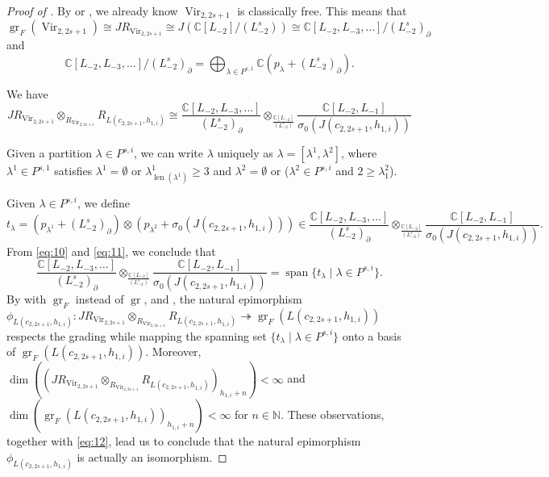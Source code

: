 \documentclass[a4paper, 12pt, reqno]{amsart}
\theoremstyle{remark}
\DeclareMathOperator{\Vir}{Vir}
\DeclareMathOperator{\len}{len}
\DeclareMathOperator{\gr}{gr}
\DeclareMathOperator{\vspan}{span}
\begin{document}
\begin{proof}[Proof of ]
  By \cite{van_ekeren_chiral_2021} or \cite{bruschek_arc_2013}, we already know $\Vir_{2, 2s + 1}$ is classically free.
  This means that $\gr_F(\Vir_{2, 2s + 1}) \cong JR_{\Vir_{2, 2s + 1}} \cong J(\mathbb{C}[L_{-2}]/(L_{-2}^s)) \cong \mathbb{C}[L_{-2}, L_{-3}, \dots]/(L_{-2}^s)_{\partial}$ and
  \begin{equation}
    \label{eq:11}
    \mathbb{C}[L_{-2}, L_{-3}, \dots]/(L_{-2}^s)_{\partial} = \bigoplus_{\lambda \in P^{s, 1}}\mathbb{C}(p_{\lambda} + (L_{-2}^s)_{\partial}).
  \end{equation}

  We have
  \begin{equation*}
    JR_{\Vir_{2, 2s + 1}} \otimes_{R_{\Vir_{2, 2s + 1}}} R_{L(c_{2, 2s + 1}, h_{1, i})} \cong \frac{\mathbb{C}[L_{-2}, L_{-3}, \dots]}{(L_{-2}^s)_{\partial}} \otimes_{\frac{\mathbb{C}[L_{-2}]}{(L_{-2}^s)}}\frac{\mathbb{C}[L_{-2}, L_{-1}]}{\sigma_0(J(c_{2, 2s + 1}, h_{1, i}))}
  \end{equation*}

  Given a partition $\lambda \in P^{s, i}$, we can write $\lambda$ uniquely as $\lambda = [\lambda^1, \lambda^2]$, where $\lambda^1 \in P^{s, 1}$ satisfies $\lambda^1 = \emptyset$ or $\lambda^1_{\len(\lambda^1)} \ge 3$ and $\lambda^2 = \emptyset$ or ($\lambda^2 \in P^{s, i}$ and $2 \ge \lambda^2_1$).

  Given $\lambda \in P^{s, i}$, we define
  \begin{equation*}
    t_{\lambda} = (p_{\lambda^1} + (L_{-2}^s)_{\partial})\otimes(p_{\lambda^2} + \sigma_0(J(c_{2, 2s + 1}, h_{1, i}))) \in \frac{\mathbb{C}[L_{-2}, L_{-3}, \dots]}{(L_{-2}^s)_{\partial}} \otimes_{\frac{\mathbb{C}[L_{-2}]}{(L_{-2}^s)}} \frac{\mathbb{C}[L_{-2}, L_{-1}]}{\sigma_0(J(c_{2, 2s + 1}, h_{1, i}))}.
  \end{equation*}
  From \eqref{eq:10} and \eqref{eq:11}, we conclude that
  \begin{equation}
    \label{eq:12}
    \frac{\mathbb{C}[L_{-2}, L_{-3}, \dots]}{(L_{-2}^s)_{\partial}} \otimes_{\frac{\mathbb{C}[L_{-2}]}{(L_{-2}^s)}} \frac{\mathbb{C}[L_{-2}, L_{-1}]}{\sigma_0(J(c_{2, 2s + 1}, h_{1, i}))} = \vspan\{t_{\lambda} \mid \lambda \in P^{s, i}\}.
  \end{equation}
  By  with $\gr_F$ instead of $\gr$,  and , the natural epimorphism $\phi_{L(c_{2, 2s + 1}, h_{1, i})}: JR_{\Vir_{2, 2s + 1}} \otimes_{R_{\Vir_{2, 2s + 1}}} R_{L(c_{2, 2s + 1}, h_{1, i})} \twoheadrightarrow \gr_F(L(c_{2, 2s + 1}, h_{1, i}))$ respects the grading while mapping the spanning set $\{t_{\lambda} \mid \lambda \in P^{s, i}\}$ onto a basis of $\gr_F(L(c_{2, 2s + 1}, h_{1, i}))$.
  Moreover, $\dim((JR_{\Vir_{2, 2s + 1}} \otimes_{R_{\Vir_{2, 2s + 1}}} R_{L(c_{2, 2s + 1}, h_{1, i})})_{h_{1, i} + n})< \infty$ and $\dim(\gr_F(L(c_{2, 2s + 1}, h_{1, i}))_{h_{1, i} + n})< \infty$ for $n \in \mathbb{N}$.
  These observations, together with \eqref{eq:12}, lead us to conclude that the natural epimorphism $\phi_{L(c_{2, 2s + 1}, h_{1, i})}$ is actually an isomorphism.
\end{proof}
\end{document}
